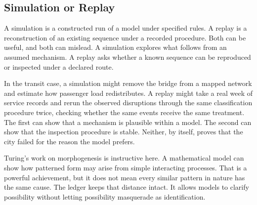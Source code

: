 \documentclass[11pt,a4paper,openany]{book}
\begin{document}
\subsection{Simulation or Replay}
A simulation is a constructed run of a model under specified rules. A replay is a reconstruction of an existing sequence under a recorded procedure. Both can be useful, and both can mislead. A simulation explores what follows from an assumed mechanism. A replay asks whether a known sequence can be reproduced or inspected under a declared route. \cite{newman_networks,barabasi_scale_free}\par
In the transit case, a simulation might remove the bridge from a mapped network and estimate how passenger load redistributes. A replay might take a real week of service records and rerun the observed disruptions through the same classification procedure twice, checking whether the same events receive the same treatment. The first can show that a mechanism is plausible within a model. The second can show that the inspection procedure is stable. Neither, by itself, proves that the city failed for the reason the model prefers.\par
Turing's work on morphogenesis is instructive here. A mathematical model can show how patterned form may arise from simple interacting processes. That is a powerful achievement, but it does not mean every similar pattern in nature has the same cause. The ledger keeps that distance intact. It allows models to clarify possibility without letting possibility masquerade as identification.\par
\end{document}
